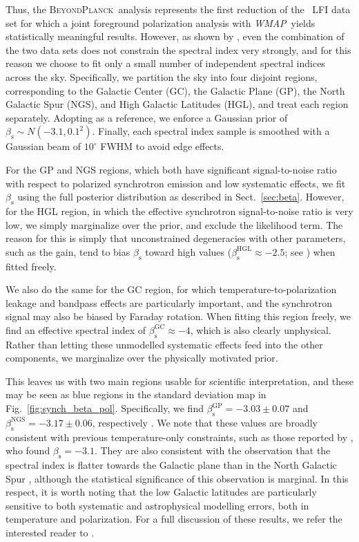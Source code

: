 \documentclass[twocolumn]{aa}
\def\WMAP{\emph{WMAP}}
\newcommand{\BP}{\textsc{BeyondPlanck}}
\begin{document}
Thus, the \BP\ analysis represents the first reduction of the \Planck\ LFI
data set for which a joint foreground polarization analysis
with \WMAP\ yields statistically meaningful results. However, as shown
by \citet{bp14}, even the combination of the two data sets does not
constrain the spectral index very strongly, and for this reason we
choose to fit only a small number of independent spectral indices
across the sky. Specifically, we partition the sky into four disjoint
regions, corresponding to the Galactic Center (GC), the Galactic Plane
(GP), the North Galactic Spur (NGS), and High Galactic Latitudes
(HGL), and treat each region separately. Adopting
\citet{planck2014-a12} as a reference, we enforce a Gaussian prior of
$\beta_{\mathrm{s}}\sim N(-3.1,0.1^2)$. Finally, each spectral index
sample is smoothed with a Gaussian beam of $10^{\circ}$ FWHM to avoid
edge effects.

For the GP and NGS regions, which both have significant
signal-to-noise ratio with respect to polarized synchrotron emission
and low systematic effects, we fit $\beta_{\mathrm{s}}$ using the full
posterior distribution as described in Sect.~\ref{sec:beta}. However,
for the HGL region, in which the effective synchrotron signal-to-noise
ratio is very low, we simply marginalize over the prior, and exclude
the likelihood term. The reason for this is simply that unconstrained
degeneracies with other parameters, such as the gain, tend to bias
$\beta_{\mathrm{s}}$ toward high values
($\beta_{\mathrm{s}}^{\mathrm{HGL}}\approx-2.5$; see \citealp{bp14})
when fitted freely. 

We also do the same for the GC region, for which
temperature-to-polarization leakage and bandpass effects are
particularly important, and the synchrotron signal may also be biased
by Faraday rotation. When fitting this region freely, we find an
effective spectral index of
$\beta_{\mathrm{s}}^{\mathrm{GC}}\approx-4$, which is also clearly
unphysical. Rather than letting these unmodelled systematic effects
feed into the other components, we marginalize over the physically
motivated prior.

This leaves us with two main regions usable for scientific
interpretation, and these may be seen as blue regions in the standard
deviation map in Fig.~\ref{fig:synch_beta_pol}. Specifically, we find
${\beta_{\mathrm{s}}^{\mathrm{GP}}=-3.03\pm0.07}$ and
${\beta_{\mathrm{s}}^{\mathrm{NGS}}=-3.17\pm0.06}$, respectively
\citep{bp14}. We note that these values are broadly consistent with
previous temperature-only constraints, such as those reported by
\citet{planck2014-a12}, who found $\beta_{\mathrm{s}}=-3.1$. They are
also consistent with the observation that the spectral index is
flatter towards the Galactic plane than in the North Galactic Spur
\citep[e.g.,][]{kogut:2012,fuskeland2014,fuskeland:2019}, although the
statistical significance of this observation is marginal. In this
respect, it is worth noting that the low Galactic latitudes are
particularly sensitive to both systematic and astrophysical modelling
errors, both in temperature and polarization.  For a full discussion
of these results, we refer the interested reader to \citet{bp14}.
\end{document}
